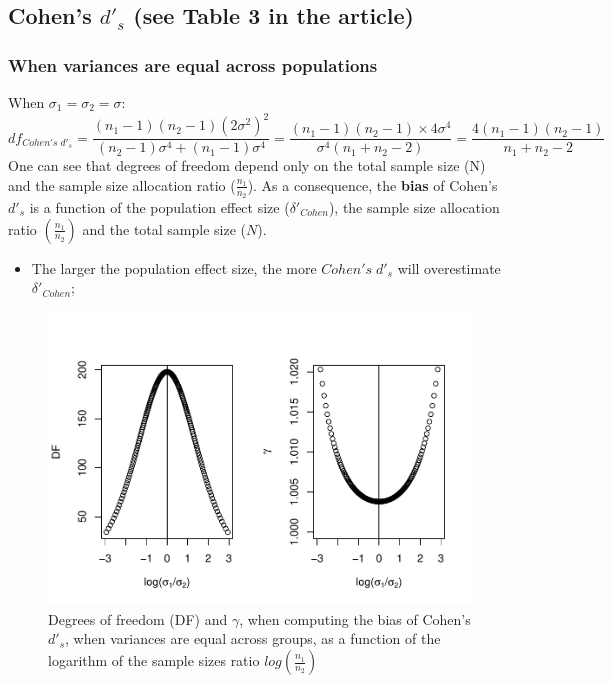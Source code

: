 \documentclass[
  man]{apa6}
\providecommand{\tightlist}{%
  \setlength{\itemsep}{0pt}\setlength{\parskip}{0pt}}
\begin{document}
\hypertarget{cohens-d_s-see-table-3-in-the-article}{%
\subsection{\texorpdfstring{Cohen's \(d'_s\) (see Table 3 in the article)}{Cohen's d'\_s (see Table 3 in the article)}}\label{cohens-d_s-see-table-3-in-the-article}}

\hypertarget{when-variances-are-equal-across-populations}{%
\subsubsection{When variances are equal across populations}\label{when-variances-are-equal-across-populations}}

When \(\sigma_1=\sigma_2=\sigma\):
\[df_{Cohen's \; d'_s} = \frac{(n_1-1)(n_2-1)(2\sigma^2)^2}{(n_2-1)\sigma^4+(n_1-1)\sigma^4} = \frac{(n_1-1)(n_2-1)\times 4\sigma^4}{\sigma^4(n_1+n_2-2)} = \frac{4(n_1-1)(n_2-1)}{n_1+n_2-2}\]
One can see that degrees of freedom depend only on the total sample size (N) and the sample size allocation ratio (\(\frac{n_1}{n_2}\)). As a consequence, the \textbf{bias} of Cohen's \(d'_s\) is a function of the population effect size (\(\delta'_{Cohen}\)), the sample size allocation ratio \(\left(\frac{n_1}{n_2} \right)\) and the total sample size (\(N\)).

\begin{itemize}
\tightlist
\item
  The larger the population effect size, the more \(Cohen's \; d'_s\) will overestimate \(\delta'_{Cohen}\);
\end{itemize}

\begin{figure}
\centering
\includegraphics{Theoretical-Bias-of-all-estimators-as-a-function-of-population-parameters_files/figure-latex/biascohendprimehomNratio2-1.pdf}
\caption{\label{fig:biascohendprimehomNratio2}Degrees of freedom (DF) and \(\gamma\), when computing the bias of Cohen's \(d'_s\), when variances are equal across groups, as a function of the logarithm of the sample sizes ratio \(log\left(\frac{n_1}{n_2} \right)\)}
\end{figure}
\end{document}
